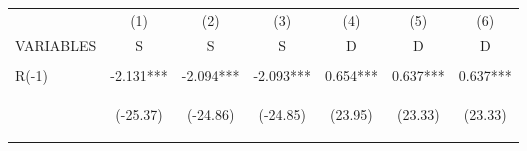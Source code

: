 \documentclass[]{standalone}
\begin{document}
\begin{tabular}{lcccccc} \hline
                     & (1)                                            & (2)                                            & (3)                                            & (4)                                            & (5)                                            & (6)                                            \\
    VARIABLES        & S                                              & S                                              & S                                              & D                                              & D                                              & D                                              \\ \hline
    \vspace{4pt}     & \begin{footnotesize}\end{footnotesize}         & \begin{footnotesize}\end{footnotesize}         & \begin{footnotesize}\end{footnotesize}         & \begin{footnotesize}\end{footnotesize}         & \begin{footnotesize}\end{footnotesize}         & \begin{footnotesize}\end{footnotesize}         \\
    R(-1)            & -2.131***                                      & -2.094***                                      & -2.093***                                      & 0.654***                                       & 0.637***                                       & 0.637***                                       \\
    \vspace{4pt}     & \begin{footnotesize}(-25.37)\end{footnotesize} & \begin{footnotesize}(-24.86)\end{footnotesize} & \begin{footnotesize}(-24.85)\end{footnotesize} & \begin{footnotesize}(23.95)\end{footnotesize}  & \begin{footnotesize}(23.33)\end{footnotesize}  & \begin{footnotesize}(23.33)\end{footnotesize}  \\

\end{tabular}
\end{document}
